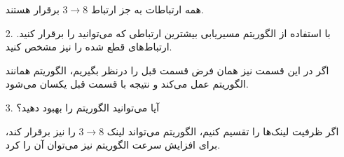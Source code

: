 \begin{enumerate}
	\item [ ]
	\begin{qsolve}
		همه ارتباطات به جز ارتباط $3 \rightarrow 8 $ برقرار هستند.
	\end{qsolve}
	
	
	\item [2. ]
	با استفاده از الگوریتم مسیریابی  بیشترین ارتباطی که می‌توانید را برقرار کنید. ارتباط‌های قطع شده را نیز مشخص کنید.
	
	\begin{qsolve}
		اگر در این قسمت نیز همان فرض قسمت قبل را درنظر بگیریم، الگوریتم  همانند الگوریتم  عمل می‌کند و نتیجه با قسمت قبل یکسان می‌شود.
	\end{qsolve}
	
	
	
	
	\item [3. ]
	آیا می‌توانید الگوریتم  را بهبود دهید؟
	\begin{qsolve}
		اگر ظرفیت لینک‌ها را تقسیم کنیم، الگوریتم  می‌تواند لینک $3 \rightarrow 8 $ را نیز برقرار کند، برای افزایش سرعت الگوریتم نیز می‌توان آن را  کرد.
	\end{qsolve}
\end{enumerate}